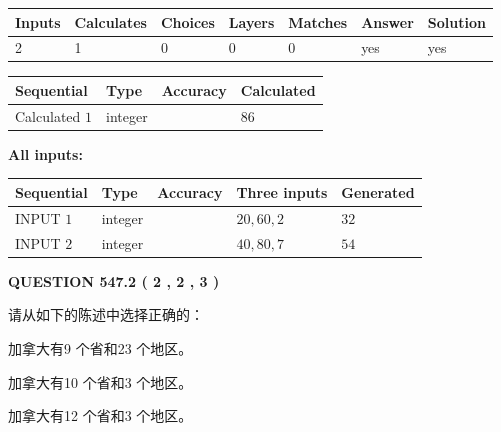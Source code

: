 \documentclass{ctexart}
\begin{document}
   
\noindent\begin{tabular}{|l|l|l|l|l|l|l|}
 \hline
Inputs & Calculates & Choices & Layers & Matches & Answer & Solution \\ \hline
 2  & 
 1  & 
 0
  & 
 0  & 
 0  & 
  yes & 
  yes 
  \\ \hline
 \end{tabular}
   
   
   
   
\noindent{}
   
   
  
  
\noindent\begin{tabular}{|l|l|l|l|}
\hline
 Sequential & Type & Accuracy & Calculated \\ 
\hline
 
 
  Calculated $  1 $ & integer &  & 
  $ 86 $ 
 \\  \hline  
 \end{tabular}
   
   
   
   
\noindent\vspace{0.1in}\hspace{-0.08in} {\textbf{\Large{All inputs: }}}
   
   
  
  
\noindent\begin{tabular}{|l|l|l|l|l|}
\hline
 Sequential & Type & Accuracy & Three inputs & Generated \\ 
\hline
 
 
  INPUT $  1 $ & integer &  & $
 20
 , 
 60
 , 
 2
 $ & $ 32 $ 
 \\  \hline  
 
 
  INPUT $  2 $ & integer &  & $
 40
 , 
 80
 , 
 7
 $ & $ 54 $ 
 \\  \hline  
 \end{tabular}
   
   
  
\vspace{0.2in}
  
{\textbf{\Large{QUESTION
547.2 
 ( 2 , 2 , 3 )
}}}
  
  
请从如下的陈述中选择正确的：
 
 
加拿大有9 个省和23 个地区。
 
 
加拿大有10 个省和3 个地区。
 
 
加拿大有12 个省和3 个地区。
 
\end{document}
